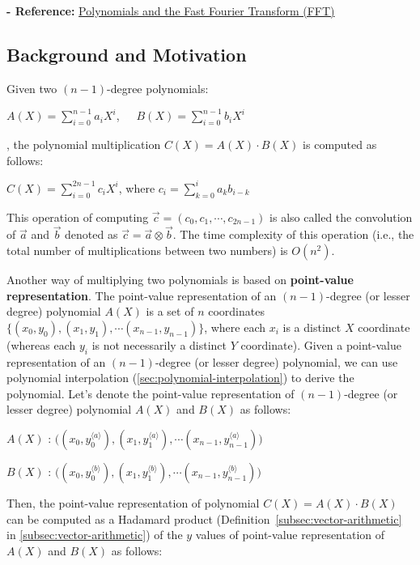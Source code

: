\textbf{- Reference:} 
\href{http://web.cecs.pdx.edu/~maier/cs584/Lectures/lect07b-11-MG.pdf}{Polynomials and the Fast Fourier Transform (FFT)}~\cite{ntt}

\subsection{Background and Motivation}
\label{subsec:ntt-motivation}

Given two $(n-1)$-degree polynomials:

$A(X) = \sum\limits_{i=0}^{n-1}a_iX^i$, \textcolor{white}{...} $B(X) = \sum\limits_{i=0}^{n-1}b_iX^i$

, the polynomial multiplication $C(X) = A(X)\cdot B(X)$ is computed as follows:

$C(X) = \sum\limits_{i=0}^{2n-1}c_iX^{i}$, where $c_i = \sum\limits_{k=0}^{i}a_kb_{i-k}$

This operation of computing $\vec{c} = (c_0, c_1, \cdots, c_{2n-1})$ is also called the convolution of $\vec a$ and $\vec b$ denoted as $\vec{c} = \vec{a} \otimes \vec{b}$. The time complexity of this operation (i.e., the total number of multiplications between two numbers) is $O(n^2)$. 

Another way of multiplying two polynomials is based on \textbf{point-value representation}. The point-value representation of an $(n-1)$-degree (or lesser degree) polynomial $A(X)$ is a set of $n$ coordinates $\{(x_0, y_0), (x_1, y_1), \cdots (x_{n-1}, y_{n-1})\}$, where each $x_i$ is a distinct $X$ coordinate (whereas each $y_i$ is not necessarily a distinct $Y$ coordinate). Given a point-value representation of an $(n-1)$-degree (or lesser degree) polynomial, we can use polynomial interpolation (\autoref{sec:polynomial-interpolation}) to derive the polynomial. 
Let's denote the point-value representation of $(n-1)$-degree (or lesser degree) polynomial $A(X)$ and $B(X)$ as follows:

$A(X)$ : $\bm ( ({x}_0, {y}_0^{\langle a \rangle}), ({x}_1, {y}_1^{\langle a \rangle}), \cdots ({x}_{n-1}, {y}_{n-1}^{\langle a \rangle}) \bm )$

$B(X)$ : $\bm ( ({x}_0, {y}_0^{\langle b \rangle}), ({x}_1, {y}_1^{\langle b \rangle}), \cdots ({x}_{n-1}, {y}_{n-1}^{\langle b \rangle}) \bm )$


Then, the point-value representation of polynomial $C(X) = A(X) \cdot B(X)$ can be computed as a Hadamard product (Definition~\ref*{subsec:vector-arithmetic} in \autoref{subsec:vector-arithmetic}) of the $y$ values of point-value representation of $A(X)$ and $B(X)$ as follows:

